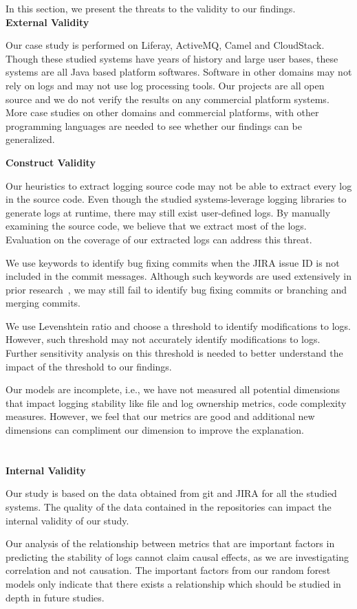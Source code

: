 In this section, we present the threats to the validity to our findings. \\


\noindent \textbf{External Validity}

Our case study is performed on Liferay, ActiveMQ, Camel and CloudStack. Though these studied systems have years of history and large user bases, these systems are all Java based platform softwares.  Software in other domains may not rely on logs and may not use log processing tools. Our projects are all open source and we do not verify the results on any commercial platform systems. More case studies on other domains and commercial platforms, with other programming languages are needed to see whether our findings can be generalized. 



\noindent \textbf{Construct Validity}


Our heuristics to extract logging source code may not be able to extract every log in the source code. Even though the studied systems-leverage logging libraries to generate logs at runtime, there may still exist user-defined logs. By manually examining the source code, we believe that we extract most of the logs. Evaluation on the coverage of our extracted logs can address this threat.


We use keywords to identify bug fixing commits when the JIRA issue ID is not included in the commit messages. Although such keywords are used extensively in prior research~\cite{EMSEIAN}, we may still fail to identify bug fixing commits or branching and merging commits.

We use Levenshtein ratio and choose a threshold to identify modifications to logs. However, such threshold may not accurately identify modifications to logs. Further sensitivity analysis on this threshold is needed to better understand the impact of the threshold to our findings.

Our models are incomplete, i.e., we have not measured all potential dimensions that impact logging stability like file and log ownership metrics, code complexity measures. However, we feel that our metrics are good and additional new dimensions can compliment our dimension to improve the explanation.\\ 
\\\\
\noindent \textbf{Internal Validity}

Our study is based on the data obtained from git and JIRA for all the studied systems. The quality of the data contained in the repositories can impact the internal validity of our study.

Our analysis of the relationship between metrics that are important factors in predicting the stability of logs cannot claim causal effects, as we are investigating correlation and not causation. The important factors from our random forest models only indicate that there exists a relationship which should be studied in depth in future studies. 



